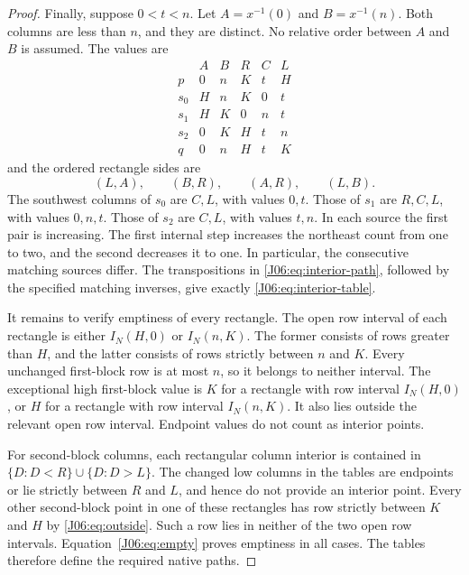 \documentclass[11pt,oneside]{report}
\theoremstyle{definition}
\numberwithin{equation}{section}
\begin{document}
\begin{proof}
Finally, suppose $0<t<n$. Let $A=x^{-1}(0)$ and $B=x^{-1}(n)$.
Both columns are less than $n$, and they are distinct. No relative
order between $A$ and $B$ is assumed. The values are
\begin{equation}\label{J06:eq:interior-table}
\begin{array}{c|rrrrr}
 &A&B&R&C&L\\\hline
 p   &0&n&K&t&H\\
 s_0 &H&n&K&0&t\\
 s_1 &H&K&0&n&t\\
 s_2 &0&K&H&t&n\\
 q   &0&n&H&t&K
\end{array}
\end{equation}
and the ordered rectangle sides are
\begin{equation}\label{J06:eq:interior-path}
 (L,A),\qquad (B,R),\qquad (A,R),\qquad (L,B).
\end{equation}
The southwest columns of $s_0$ are $C,L$, with values $0,t$.
Those of $s_1$ are $R,C,L$, with values $0,n,t$.
Those of $s_2$ are $C,L$, with values $t,n$.
In each source the first pair is increasing. The first internal step
increases the northeast count from one to two, and the second decreases
it to one. In particular, the consecutive matching sources differ.
The transpositions in \eqref{J06:eq:interior-path}, followed by the specified
matching inverses, give exactly \eqref{J06:eq:interior-table}.

It remains to verify emptiness of every rectangle. The open row interval
of each rectangle is either $I_N(H,0)$ or $I_N(n,K)$.
The former consists of rows greater than $H$, and the latter consists
of rows strictly between $n$ and $K$.
Every unchanged first-block row is at most $n$, so it belongs to neither
interval. The exceptional high first-block value is $K$ for a rectangle
with row interval $I_N(H,0)$, or $H$ for a rectangle with row interval
$I_N(n,K)$. It also lies outside the relevant open row interval.
Endpoint values do not count as interior points.

For second-block columns, each rectangular column interior is contained
in $\{D:D<R\}\cup\{D:D>L\}$. The changed low columns in the tables
are endpoints or lie strictly between $R$ and $L$, and hence do not
provide an interior point. Every other second-block point in one of
these rectangles has row strictly between $K$ and $H$ by
\eqref{J06:eq:outside}. Such a row lies in neither of the two open row
intervals. Equation~\eqref{J06:eq:empty} proves emptiness in all cases.
The tables therefore define the required native paths.
\end{proof}
\end{document}
